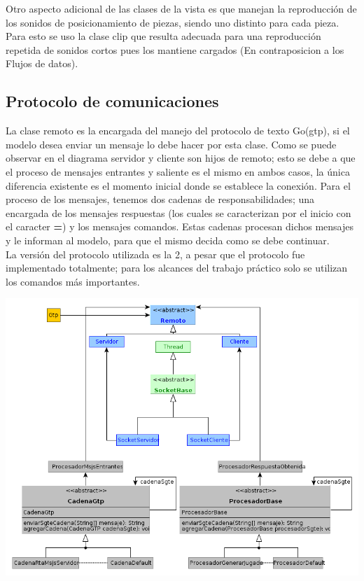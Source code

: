 \documentclass[11pt]{article}
\begin{document}
Otro aspecto adicional de las clases de la vista es que manejan la reproducción de los sonidos de posicionamiento de piezas, siendo uno distinto para cada pieza. Para esto se uso la clase clip que resulta adecuada para una reproducci\'on repetida de sonidos cortos pues los mantiene cargados (En contraposicion a los Flujos de datos).

\subsection{Protocolo de comunicaciones}
\label{sec-4.2}
%  

La clase remoto es la encargada del manejo del protocolo de texto Go(gtp), 
si el modelo desea enviar un mensaje lo debe hacer por esta clase. 
Como se puede observar en el diagrama servidor y cliente son hijos de remoto; 
esto se debe a que el proceso de mensajes entrantes y saliente es el mismo en ambos casos, 
la \'unica diferencia existente es el momento inicial donde se establece la conexi\'on. 
Para el proceso de los mensajes, tenemos dos cadenas de responsabilidades; una encargada de los mensajes respuestas
(los cuales se caracterizan por el inicio con el caracter \textbf{=}) y los mensajes comandos. 
Estas cadenas procesan dichos mensajes y le informan al modelo, para que el mismo decida como se debe continuar. \\
La versi\'on del protocolo utilizada es la 2, a pesar que el protocolo fue implementado totalmente; 
para los alcances del trabajo pr\'actico solo se utilizan los comandos m\'as importantes.

\begin{center}
 \includegraphics[scale=0.6]{./Diagramas/DiagramaRemoto/diagrama_remoto.png}
 \end{center}
\end{document}
